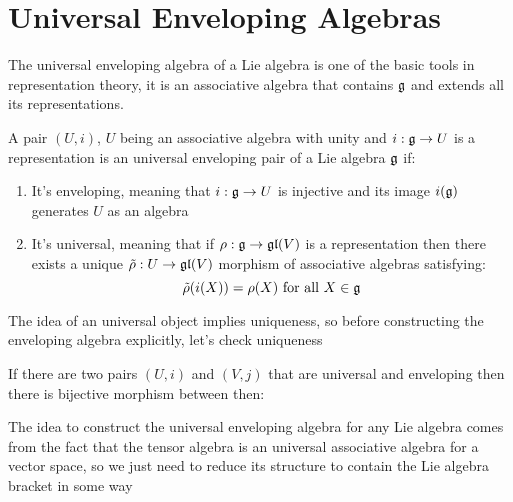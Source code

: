 \section{Universal Enveloping Algebras}
The universal enveloping algebra of a Lie algebra is one of the basic tools in representation theory, it is an associative algebra that contains $\mathfrak{g}$ and extends all its representations.
\begin{defi}
	A pair $(U,i)$, $U$ being an associative algebra with unity and $i:\mathfrak{g} \rightarrow U$ is a representation is
	 an universal enveloping pair of a Lie algebra $\mathfrak{g}$ if:
	\begin{enumerate}
		\item It's enveloping, meaning that $i:\mathfrak{g} \rightarrow U$ is injective and its image $i(\mathfrak{g})$ generates $U$ as an algebra
		\item It's universal, meaning that if $\rho:\mathfrak{g} \rightarrow \mathfrak{gl}(V)$ is a representation then there exists a unique $\tilde{\rho}:U \rightarrow \mathfrak{gl}(V)$ morphism of associative algebras satisfying:
		$$ \tilde{\rho}(i(X)) = \rho(X) \text{ for all }X \in \mathfrak{g}$$
	\end{enumerate}
	\begin{center}
	\end{center}
	\label{41UniversalDef}
\end{defi}
The idea of an universal object implies uniqueness, so before constructing the enveloping algebra explicitly, let's check uniqueness
\begin{remark}
	If there are two pairs $(U,i)$ and $(V,j)$ that are universal and enveloping then there is bijective morphism between then:
\end{remark}
\begin{center}
\end{center}
The idea to construct the universal enveloping algebra for any Lie algebra comes from the fact that the tensor algebra is an universal associative algebra for a vector space, so we just need to reduce its structure to contain the Lie algebra bracket in some way
